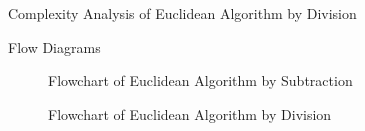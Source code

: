 \documentclass[8pt]{beamer}
\begin{document}
\begin{frame}[allowframebreaks]{Complexity Analysis of Euclidean Algorithm by Division}
\end{frame}

\begin{frame}[allowframebreaks]{Flow Diagrams}
\begin{figure}[h!]
	\begin{center}
		\resizebox{4.25cm}{!}{}
	\end{center}
	\caption{Flowchart of Euclidean Algorithm by Subtraction}
	\label{fig:Input}
\end{figure}
\begin{figure}[h!]
	\begin{center}
		\resizebox{4.25cm}{!}{}
	\end{center}
	\caption{Flowchart of Euclidean Algorithm by Division}
	\label{fig:Input}
\end{figure}
\end{frame}
\end{document}
